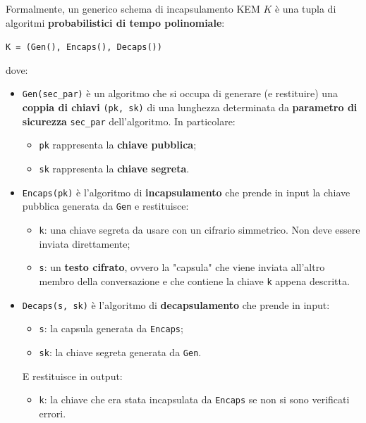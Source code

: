 \documentclass[a4paper, 12pt, oneside]{article}
\theoremstyle{definition}
\begin{document}
Formalmente, un generico schema di incapsulamento KEM $K$ è una tupla di algoritmi \textbf{probabilistici di tempo polinomiale}:

\begin{center}
    \texttt{K = (Gen(), Encaps(), Decaps())}
\end{center}

dove:

\begin{itemize}
    \item \texttt{Gen(sec\_par)} è un algoritmo che si occupa di generare (e restituire) una \textbf{coppia di chiavi} \texttt{(pk, sk)} di una lunghezza determinata da \textbf{parametro di sicurezza} \texttt{sec\_par} dell'algoritmo. In particolare: \begin{itemize}
        \item \texttt{pk} rappresenta la \textbf{chiave pubblica};
        \item \texttt{sk} rappresenta la \textbf{chiave segreta}.
    \end{itemize}
    \item \texttt{Encaps(pk)} è l'algoritmo di \textbf{incapsulamento} che prende in input la chiave pubblica generata da \texttt{Gen} e restituisce: \begin{itemize}
        \item \texttt{k}: una chiave segreta da usare con un cifrario simmetrico. Non deve essere inviata direttamente;
        \item \texttt{s}: un \textbf{testo cifrato}, ovvero la "capsula" che viene inviata all'altro membro della conversazione e che contiene la chiave \texttt{k} appena descritta.
    \end{itemize}
    \item \texttt{Decaps(s, sk)} è l'algoritmo di \textbf{decapsulamento} che prende in input: \begin{itemize}
        \item \texttt{s}: la capsula generata da \texttt{Encaps};
        \item \texttt{sk}: la chiave segreta generata da \texttt{Gen}.
    \end{itemize}

    E restituisce in output: \begin{itemize}
        \item \texttt{k}: la chiave che era stata incapsulata da \texttt{Encaps} se non si sono verificati errori.
    \end{itemize}
\end{itemize}
\end{document}

